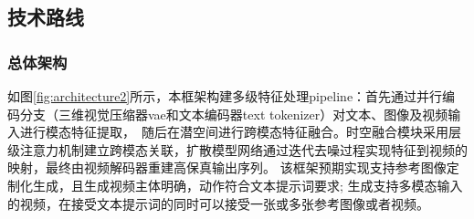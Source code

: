 \subsection{技术路线}

\subsubsection{总体架构}
如图\ref{fig:architecture2}所示，本框架构建多级特征处理pipeline：首先通过并行编码分支（三维视觉压缩器vae和文本编码器text tokenizer）对文本、图像及视频输入进行模态特征提取，\
随后在潜空间进行跨模态特征融合。时空融合模块采用层级注意力机制建立跨模态关联，扩散模型网络通过迭代去噪过程实现特征到视频的映射，最终由视频解码器重建高保真输出序列。
该框架预期实现支持参考图像定制化生成，且生成视频主体明确，动作符合文本提示词要求; 生成支持多模态输入的视频，在接受文本提示词的同时可以接受一张或多张参考图像或者视频。

\newpage
\begingroup
    \printbibliography[title={参考文献}]
\endgroup